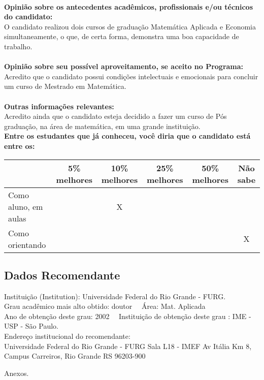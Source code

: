 \documentclass[11pt]{article}
\begin{document}
\\
\textbf{Opinião sobre os antecedentes acadêmicos, profissionais e/ou técnicos do candidato:}
\\O candidato realizou dois cursos de graduação  Matemática Aplicada e Economia  simultaneamente, o que, de certa forma, demonstra uma boa capacidade de trabalho.\\
\\
\textbf{Opinião sobre seu possível aproveitamento, se aceito no Programa:}
\\Acredito que o candidato possui condições intelectuais e emocionais para concluir um curso de Mestrado em Matemática.\\ 
\\
\textbf{Outras informações relevantes:} \\Acredito ainda que o candidato esteja decidido a fazer um curso de Pós graduação, na área de matemática, em uma grande instituição.
\\[0.3cm]
\textbf{Entre os estudantes que já conheceu, você diria que o candidato está entre os:}
\\
\begin{tabular}{|l|c|c|c|c|c|}
\hline
 & 5\% melhores & 10\% melhores & 25\% melhores & 50\% melhores & Não sabe \\
\hline
Como aluno, em aulas &  & X &  &  & \\
\hline
Como orientando &  &  &  &  & X\\
\hline
\end{tabular}
\subsection*{Dados Recomendante} 
	Instituição (Institution): Universidade Federal do Rio Grande - FURG.
\\ 
	Grau acadêmico mais alto obtido: doutor
	\ \ Área: Mat. Aplicada
	\\
	Ano de obtenção deste grau: 2002
	\ \ 
	Instituição de obtenção deste grau : IME - USP - São Paulo.
	\\ 
	Endereço institucional do recomendante: \\ Universidade Federal do Rio Grande - FURG
Sala L18 - IMEF
Av Itália Km 8, Campus Carreiros,
Rio Grande RS
96203-900 
\begin{center}
Anexos.
\end{center}
\end{document}
